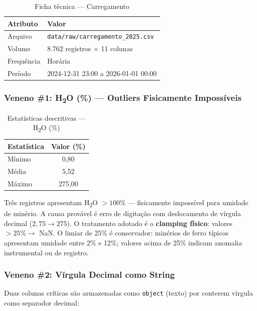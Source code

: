 \documentclass[12pt, a4paper]{article}
\newcommand{\arquivo}[1]{\texttt{#1}}
\begin{document}
\begin{table}[H]
\centering
\caption{Ficha técnica — Carregamento}
\label{tab:carreg_ficha}
\begin{tabular}{@{}ll@{}}
\toprule
\textbf{Atributo}       & \textbf{Valor} \\
\midrule
Arquivo                  & \arquivo{data/raw/carregamento\_2025.csv} \\
Volume                   & 8.762 registros $\times$ 11 colunas \\
Frequência               & Horária \\
Período                  & 2024-12-31 23:00 a 2026-01-01 00:00 \\
\bottomrule
\end{tabular}
\end{table}

\subsubsection{Veneno \#1: H\textsubscript{2}O (\%) — Outliers Fisicamente Impossíveis}

\begin{table}[H]
\centering
\caption{Estatísticas descritivas — H\textsubscript{2}O (\%)}
\label{tab:h2o_stats}
\begin{tabular}{@{}lS[table-format=3.2]@{}}
\toprule
\textbf{Estatística} & \textbf{Valor (\%)} \\
\midrule
Mínimo    & 0,80 \\
Média     & 5,52 \\
Máximo    & 275,00 \\
\bottomrule
\end{tabular}
\end{table}

Três registros apresentam H\textsubscript{2}O $> 100\%$ — fisicamente
impossível para umidade de minério. A causa provável é erro de digitação
com deslocamento de vírgula decimal ($2{,}75 \to 275$). O tratamento
adotado é o \textbf{clamping físico}: valores $> 25\% \to$ NaN. O limiar
de 25\% é conservador: minérios de ferro típicos apresentam umidade entre
2\% e 12\%; valores acima de 25\% indicam anomalia instrumental ou de
registro.

\subsubsection{Veneno \#2: Vírgula Decimal como String}

Duas colunas críticas são armazenadas como \texttt{object} (texto) por
conterem vírgula como separador decimal:
\end{document}

